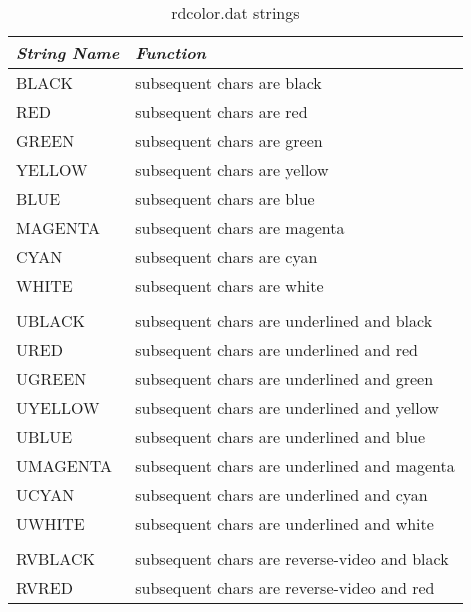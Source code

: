 \documentclass[12pt]{article}
\begin{document}
\begin{table}[thb]
  \begin{center}
  \caption{rdcolor.dat strings}
  \label{rdcolor}
  \begin{tabular}{||l|l||}
   \hline\hline
  {\em String Name}  & {\em Function}                                 \\
  \hline
  {\small BLACK}     & subsequent chars are black                     \\
  {\small RED}       & subsequent chars are red                       \\
  {\small GREEN}     & subsequent chars are green                     \\
  {\small YELLOW}    & subsequent chars are yellow                    \\
  {\small BLUE}      & subsequent chars are blue                      \\
  {\small MAGENTA}   & subsequent chars are magenta                   \\
  {\small CYAN}      & subsequent chars are cyan                      \\
  {\small WHITE}     & subsequent chars are white                     \\
                     &                                                \\
  {\small UBLACK}    & subsequent chars are underlined and black      \\
  {\small URED}      & subsequent chars are underlined and red        \\
  {\small UGREEN}    & subsequent chars are underlined and green      \\
  {\small UYELLOW}   & subsequent chars are underlined and yellow     \\
  {\small UBLUE}     & subsequent chars are underlined and blue       \\
  {\small UMAGENTA}  & subsequent chars are underlined and magenta    \\
  {\small UCYAN}     & subsequent chars are underlined and cyan       \\
  {\small UWHITE}    & subsequent chars are underlined and white      \\
                     &                                                \\
  {\small RVBLACK}   & subsequent chars are reverse-video and black   \\
  {\small RVRED}     & subsequent chars are reverse-video and red     \\

\end{tabular}
\end{center}
\end{table}
\end{document}
